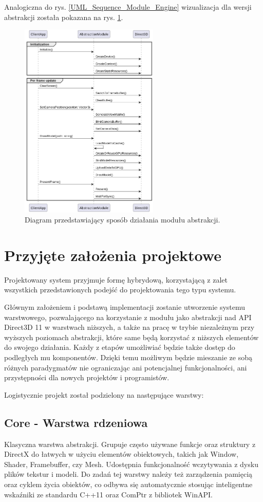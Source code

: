 Analogiczna do rys. \ref{UML_Sequence_Module_Engine} wizualizacja dla wersji abstrakcji została pokazana na rys. \ref{UML_Sequence_Module_Abstraction}.

\begin{figure}[ht!]
	\centering
	\includegraphics[width=250px]{uml/module_type_abstraction.png}
	\caption{Diagram przedstawiający sposób działania modułu abstrakcji.}
	\label{UML_Sequence_Module_Abstraction}
\end{figure}

\section{Przyjęte założenia projektowe}
Projektowany system przyjmuje formę hybrydową, korzystającą z zalet wszystkich przedstawionych podejść do projektowania tego typu systemu. 

Głównym założeniem i podstawą implementacji zostanie utworzenie systemu warstwowego, pozwalającego na korzystanie z modułu jako abstrakcji nad API Direct3D 11 w warstwach niższych, a także na pracę w trybie niezależnym przy wyższych poziomach abstrakcji, które same będą korzystać z niższych elementów do swojego działania. Każdy z etapów umożliwiać będzie także dostęp do podległych mu komponentów. Dzięki temu możliwym będzie mieszanie ze sobą różnych paradygmatów nie ograniczając ani potencjalnej funkcjonalności, ani przystępności dla nowych projektów i programistów.

Logistycznie projekt został podzielony na następujące warstwy:

\subsection{\textbf{Core} - Warstwa rdzeniowa}
Klasyczna warstwa abstrakcji. Grupuje często używane funkcje oraz struktury z DirectX do łatwych w użyciu elementów obiektowych, takich jak Window, Shader, Framebuffer, czy Mesh. Udostępnia funkcjonalność wczytywania z dysku plików tekstur i modeli. Do zadań tej warstwy należy też zarządzenia pamięcią oraz cyklem życia obiektów, co odbywa się automatycznie stosując inteligentne wskaźniki ze standardu C++11 oraz ComPtr z bibliotek WinAPI.

